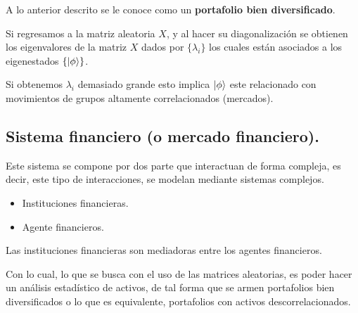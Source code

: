 A lo anterior descrito se le conoce como un \textbf{portafolio bien diversificado}.

Si regresamos a la matriz aleatoria $X$, y al hacer su diagonalización se obtienen los eigenvalores de la matriz $X$ dados por $\{\lambda_i\}$ los cuales están asociados a los eigenestados $\{\ket{\phi}\}$.

Si obtenemos $\lambda_i$ demasiado grande esto implica $\ket{\phi}$ este relacionado con movimientos de grupos altamente correlacionados (mercados).

\subsection{Sistema financiero (o mercado financiero).}

Este sistema se compone por dos parte que interactuan de forma compleja, es decir, este tipo de interacciones, se modelan mediante sistemas complejos.

\begin{itemize}
	\item Instituciones financieras.
	\item Agente financieros.
\end{itemize}

Las instituciones financieras son mediadoras entre los agentes financieros.

Con lo cual, lo que se busca con el uso de las matrices aleatorias, es poder hacer un análisis estadístico de activos, de tal forma que se armen portafolios bien diversificados o lo que es equivalente, portafolios con activos descorrelacionados.